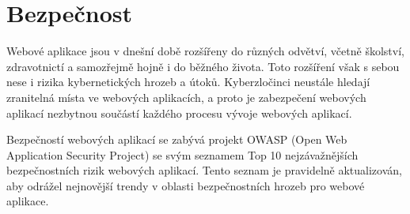 \chapter{Bezpečnost}
Webové aplikace jsou v dnešní době rozšířeny do různých odvětví, včetně školství, zdravotnictí a samozřejmě hojně i do běžného života. Toto rozšíření však s sebou nese i rizika kybernetických hrozeb a útoků. Kyberzločinci neustále hledají zranitelná místa ve webových aplikacích, a proto je zabezpečení webových aplikací nezbytnou součástí každého procesu vývoje webových aplikací. \par
Bezpečností webových aplikací se zabývá projekt OWASP (Open Web Application Security Project) se svým seznamem Top 10 nejzávažnějších bezpečnostních rizik webových aplikací. Tento seznam je pravidelně aktualizován, aby odrážel nejnovější trendy v oblasti bezpečnostních hrozeb pro webové aplikace.